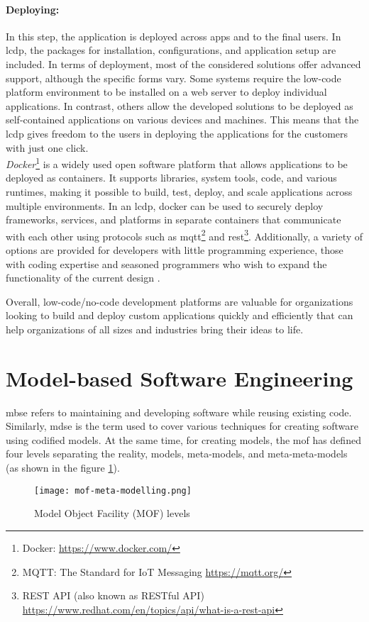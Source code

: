 \paragraph*{Deploying:}
In this step, the application is deployed across apps and to the final users.
In \ac{lcdp}, the packages for installation, configurations, and application setup are included.
In terms of deployment, most of the considered solutions offer advanced support, although the specific forms vary. 
Some systems require the low-code platform environment to be installed on a web server to deploy individual applications. 
In contrast, others allow the developed solutions to be deployed as self-contained applications on various devices and machines.
This means that the \ac{lcdp} gives freedom to the users in deploying the applications for the customers with just one click. \\
\textit{Docker}\footnote{Docker: \url{https://www.docker.com/}} is a widely used open software platform that allows applications to be deployed as containers. 
It supports libraries, system tools, code, and various runtimes, making it possible to build, test, deploy, and scale applications across multiple environments. 
In an \ac{lcdp}, docker can be used to securely deploy frameworks, services, and platforms in separate containers that communicate with each other using protocols such as \ac{mqtt}\footnote{MQTT: The Standard for IoT Messaging \url{https://mqtt.org/}} and \ac{rest}\footnote{REST API (also known as RESTful API) \url{https://www.redhat.com/en/topics/api/what-is-a-rest-api}}.
Additionally, a variety of options are provided for developers with little programming experience, those with coding expertise and seasoned programmers who wish to expand the functionality of the current design \cite{article:nocode:sahina}.

Overall, low-code/no-code development platforms are valuable for organizations looking to build and deploy custom applications quickly and efficiently that can help organizations of all sizes and industries bring their ideas to life.
\clearpage
\section{Model-based Software Engineering}
\label{background:section:mbse}
\ac{mbse} refers to maintaining and developing software while reusing existing code.
Similarly, \ac{mdse} is the term used to cover various techniques for creating software using codified models.
At the same time, for creating models, the \ac{mof} has defined four levels separating the reality, models, meta-models, and meta-meta-models (as shown in the figure \ref{fig:background:moflevels}).
\begin{figure}[htbp!]
  \centering    
  \texttt{[image: mof-meta-modelling.png]}
  \caption[MOF levels]{Model Object Facility (MOF) levels}
  \label{fig:background:moflevels}
\end{figure}

